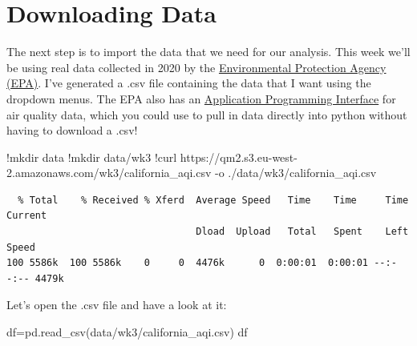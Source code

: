 \documentclass[
  letterpaper,
  DIV=11,
  numbers=noendperiod]{scrreprt}
\newenvironment{Shaded}{\begin{snugshade}}{\end{snugshade}}
\newcommand{\ErrorTok}[1]{\textcolor[rgb]{0.68,0.00,0.00}{#1}}
\newcommand{\FloatTok}[1]{\textcolor[rgb]{0.68,0.00,0.00}{#1}}
\newcommand{\NormalTok}[1]{\textcolor[rgb]{0.00,0.23,0.31}{#1}}
\newcommand{\OperatorTok}[1]{\textcolor[rgb]{0.37,0.37,0.37}{#1}}
\newcommand{\StringTok}[1]{\textcolor[rgb]{0.13,0.47,0.30}{#1}}
\begin{document}
\hypertarget{downloading-data-1}{%
\section{Downloading Data}\label{downloading-data-1}}

The next step is to import the data that we need for our analysis. This
week we'll be using real data collected in 2020 by the
\href{https://www.epa.gov/outdoor-air-quality-data/download-daily-data}{Environmental
Protection Agency (EPA)}. I've generated a .csv file containing the data
that I want using the dropdown menus. The EPA also has an
\href{https://aqs.epa.gov/aqsweb/documents/data_api.html}{Application
Programming Interface} for air quality data, which you could use to pull
in data directly into python without having to download a .csv!

\begin{Shaded}
\begin{Highlighting}[]
\OperatorTok{!}\NormalTok{mkdir data}
\OperatorTok{!}\NormalTok{mkdir data}\OperatorTok{/}\NormalTok{wk3}
\OperatorTok{!}\NormalTok{curl https:}\OperatorTok{//}\NormalTok{qm2.s3.eu}\OperatorTok{{-}}\NormalTok{west}\OperatorTok{{-}}\FloatTok{2.}\ErrorTok{amazonaws}\NormalTok{.com}\OperatorTok{/}\NormalTok{wk3}\OperatorTok{/}\NormalTok{california\_aqi.csv }\OperatorTok{{-}}\NormalTok{o .}\OperatorTok{/}\NormalTok{data}\OperatorTok{/}\NormalTok{wk3}\OperatorTok{/}\NormalTok{california\_aqi.csv}
\end{Highlighting}
\end{Shaded}

\begin{verbatim}
  % Total    % Received % Xferd  Average Speed   Time    Time     Time  Current
                                 Dload  Upload   Total   Spent    Left  Speed
100 5586k  100 5586k    0     0  4476k      0  0:00:01  0:00:01 --:--:-- 4479k
\end{verbatim}

Let's open the .csv file and have a look at it:

\begin{Shaded}
\begin{Highlighting}[]
\NormalTok{df}\OperatorTok{=}\NormalTok{pd.read\_csv(}\StringTok{\textquotesingle{}data/wk3/california\_aqi.csv\textquotesingle{}}\NormalTok{)}
\NormalTok{df}
\end{Highlighting}
\end{Shaded}
\end{document}

